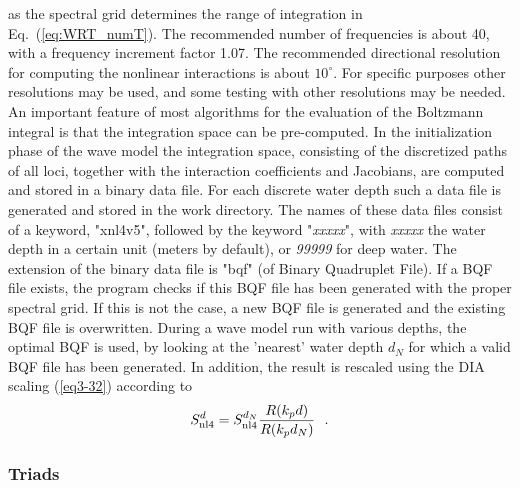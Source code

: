 \documentclass[12pt]{book}
\begin{document}
as the spectral grid determines the range of integration in Eq.~(\ref{eq:WRT_numT}).
The recommended number of frequencies is about 40, with a frequency increment factor
1.07. The recommended directional resolution
for computing the nonlinear interactions is about $10^\circ$. For
specific purposes other resolutions may be used, and some
testing with other resolutions may be needed.
\\[2ex]
\noindent
An important feature of most algorithms for the evaluation of the
Boltzmann integral is that the integration space can be pre-computed.
In the initialization phase of the wave model the
integration space, consisting of the discretized paths of all loci,
together with the interaction coefficients and Jacobians, are
computed and stored in a binary data file. For each discrete water depth such a
data file is generated
and stored in the work directory. The names of these data files
consist of a keyword, "xnl4v5", followed by the keyword "{\it{xxxxx}}", with {\it xxxxx}
the water depth in a certain unit (meters by default), or {\it 99999} for deep water.
The extension of the binary data file is "bqf" (of Binary Quadruplet
File). If a BQF file exists, the program checks if this BQF file has
been generated with the proper spectral grid. If this is not
the case, a new BQF file is generated and the existing BQF file is overwritten.
During a wave model run with various depths, the optimal BQF is
used, by looking at the 'nearest' water depth $d_N$ for which a valid BQF file has been generated.
In addition, the result is rescaled using the DIA scaling (\ref{eq3-32}) according to
\begin{equation}
  S_{\rm nl4}^{d} = S_{\rm nl4}^{d_N} \frac{R(k_pd)}{R(k_pd_N)} \:\:\: .
\end{equation}

\subsubsection{Triads} \label{sec:triad}
\end{document}

